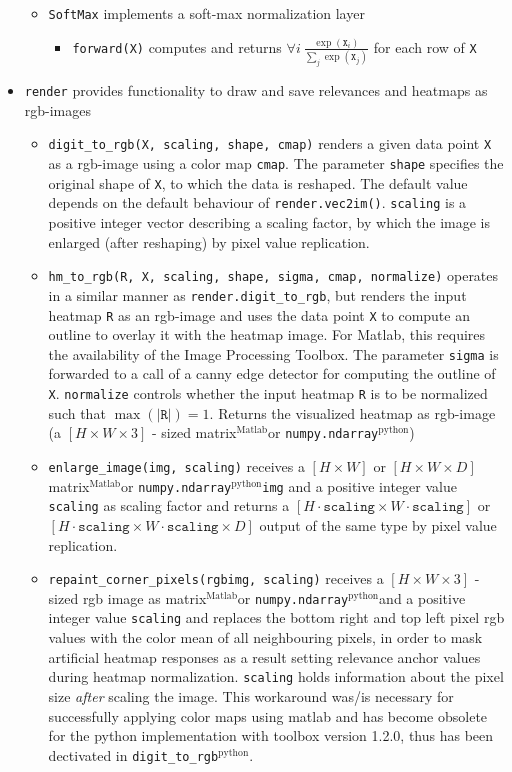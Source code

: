\documentclass[a4wide]{article}
\newcommand{\mat}{$^\text{Matlab}$}
\newcommand{\py}{$^\text{python}$}
\begin{document}
\begin{itemize}
\begin{itemize}
		\item \texttt{SoftMax} implements a soft-max normalization layer
			\begin{itemize}
				\item \texttt{forward(X)} computes and returns $\forall i ~ \frac{\exp(\texttt{X}_i)}{\sum_j \exp(\texttt{X}_j)}$ for each row of \texttt{X}
			\end{itemize}
	\end{itemize}
\item \texttt{render} provides functionality to draw and save relevances and heatmaps as rgb-images
	\begin{itemize}
		\item \texttt{digit\_to\_rgb(X, scaling, shape, cmap)} renders a given data point \texttt{X} as a rgb-image using a color map \texttt{cmap}. The parameter \texttt{shape} specifies the original shape of \texttt{X}, to which the data is reshaped. The default value depends on the default behaviour of \texttt{render.vec2im()}. \texttt{scaling} is a positive integer vector describing a scaling factor, by which the image is enlarged (after reshaping) by pixel value replication.
		\item \texttt{hm\_to\_rgb(R, X, scaling, shape, sigma, cmap, normalize)} operates in a similar manner as \texttt{render.digit\_to\_rgb}, but renders the input heatmap \texttt{R} as an rgb-image and uses the data point \texttt{X} to compute an outline to overlay it with the heatmap image. For Matlab, this requires the availability of the Image Processing Toolbox. The parameter \texttt{sigma} is forwarded to a call of a canny edge detector for computing the outline of \texttt{X}. \texttt{normalize} controls whether the input heatmap \texttt{R} is to be normalized such that $\max(|\texttt{R}|) = 1$. Returns the visualized heatmap as rgb-image (a $[H \times W \times 3]$ - sized matrix\mat or \texttt{numpy.ndarray}\py)
		\item \texttt{enlarge\_image(img, scaling)} receives a $[H \times W]$ or $[H \times W \times D]$ matrix\mat or \texttt{numpy.ndarray}\py \texttt{img} and a positive integer value \texttt{scaling} as scaling factor and returns a $[H\cdot\texttt{scaling} \times W\cdot\texttt{scaling}]$ or $[H\cdot\texttt{scaling} \times W\cdot\texttt{scaling} \times D]$ output of the same type by pixel value replication.
		\item \texttt{repaint\_corner\_pixels(rgbimg, scaling)} receives a $[H \times W \times 3]$ - sized rgb image as matrix\mat or \texttt{numpy.ndarray}\py and a positive integer value \texttt{scaling} and replaces the bottom right and top left pixel rgb values with the color mean of all neighbouring pixels, in order to mask artificial heatmap responses as a result setting relevance anchor values during heatmap normalization. \texttt{scaling} holds information about the pixel size \emph{after} scaling the image. This workaround was/is necessary for successfully applying color maps using matlab and has become obsolete for the python implementation with toolbox version 1.2.0, thus has been dectivated in \texttt{digit\_to\_rgb\py}.

\end{itemize}
\end{itemize}
\end{document}
